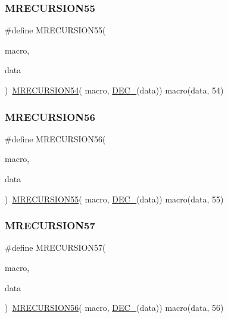 \subsubsection{\texorpdfstring{MRECURSION55}{MRECURSION55}}
{\footnotesize\ttfamily \#define M\+R\+E\+C\+U\+R\+S\+I\+O\+N55(\begin{DoxyParamCaption}\item[{}]{macro,  }\item[{}]{data }\end{DoxyParamCaption})~\mbox{\hyperlink{group__group__sam0__utils__mrecursion_ga1b859acc9e5724f34b432b236b8fd422}{M\+R\+E\+C\+U\+R\+S\+I\+O\+N54}}(  macro, \mbox{\hyperlink{group__group__sam0__utils__mrecursion_ga1d23d683797679dca8c3512a54a5dcae}{D\+E\+C\+\_\+}}(data))   macro(data, 54)}

\mbox{\label{group__group__sam0__utils__mrecursion_ga1899efaf30176f2ad8b7b1e22b2564c5}} 
\subsubsection{\texorpdfstring{MRECURSION56}{MRECURSION56}}
{\footnotesize\ttfamily \#define M\+R\+E\+C\+U\+R\+S\+I\+O\+N56(\begin{DoxyParamCaption}\item[{}]{macro,  }\item[{}]{data }\end{DoxyParamCaption})~\mbox{\hyperlink{group__group__sam0__utils__mrecursion_ga9ebaa5b7ac45c089517951e6978ee88a}{M\+R\+E\+C\+U\+R\+S\+I\+O\+N55}}(  macro, \mbox{\hyperlink{group__group__sam0__utils__mrecursion_ga1d23d683797679dca8c3512a54a5dcae}{D\+E\+C\+\_\+}}(data))   macro(data, 55)}

\mbox{\label{group__group__sam0__utils__mrecursion_ga701249519fa778a36982d5e3079aed83}} 
\subsubsection{\texorpdfstring{MRECURSION57}{MRECURSION57}}
{\footnotesize\ttfamily \#define M\+R\+E\+C\+U\+R\+S\+I\+O\+N57(\begin{DoxyParamCaption}\item[{}]{macro,  }\item[{}]{data }\end{DoxyParamCaption})~\mbox{\hyperlink{group__group__sam0__utils__mrecursion_ga1899efaf30176f2ad8b7b1e22b2564c5}{M\+R\+E\+C\+U\+R\+S\+I\+O\+N56}}(  macro, \mbox{\hyperlink{group__group__sam0__utils__mrecursion_ga1d23d683797679dca8c3512a54a5dcae}{D\+E\+C\+\_\+}}(data))   macro(data, 56)}

